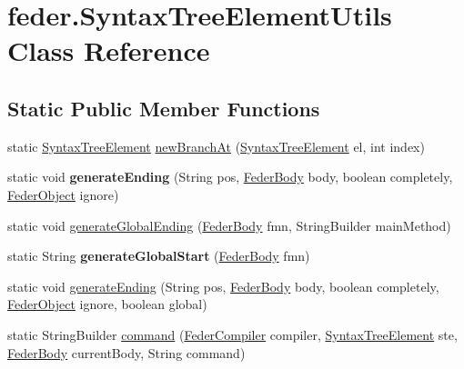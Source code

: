 \hypertarget{classfeder_1_1SyntaxTreeElementUtils}{}\section{feder.\+Syntax\+Tree\+Element\+Utils Class Reference}
\label{classfeder_1_1SyntaxTreeElementUtils}
\subsection*{Static Public Member Functions}
\begin{DoxyCompactItemize}
\item 
static \hyperlink{classfeder_1_1SyntaxTreeElement}{Syntax\+Tree\+Element} \hyperlink{classfeder_1_1SyntaxTreeElementUtils_afcde196c5acf46ac47215472b458a9db}{new\+Branch\+At} (\hyperlink{classfeder_1_1SyntaxTreeElement}{Syntax\+Tree\+Element} el, int index)
\item 
\mbox{\label{classfeder_1_1SyntaxTreeElementUtils_a7bdf9a560334fe2e7308d9605be30ada}} 
static void {\bfseries generate\+Ending} (String pos, \hyperlink{classfeder_1_1types_1_1FederBody}{Feder\+Body} body, boolean completely, \hyperlink{classfeder_1_1types_1_1FederObject}{Feder\+Object} ignore)
\item 
static void \hyperlink{classfeder_1_1SyntaxTreeElementUtils_a608f093f506ff9510122e9a1edb17a1f}{generate\+Global\+Ending} (\hyperlink{classfeder_1_1types_1_1FederBody}{Feder\+Body} fmn, String\+Builder main\+Method)
\item 
\mbox{\label{classfeder_1_1SyntaxTreeElementUtils_a01403205742701e146b72ef06497109f}} 
static String {\bfseries generate\+Global\+Start} (\hyperlink{classfeder_1_1types_1_1FederBody}{Feder\+Body} fmn)
\item 
static void \hyperlink{classfeder_1_1SyntaxTreeElementUtils_a40c8617b9b9836ebbe66dcdccdb52ffe}{generate\+Ending} (String pos, \hyperlink{classfeder_1_1types_1_1FederBody}{Feder\+Body} body, boolean completely, \hyperlink{classfeder_1_1types_1_1FederObject}{Feder\+Object} ignore, boolean global)
\item 
static String\+Builder \hyperlink{classfeder_1_1SyntaxTreeElementUtils_a7df6f6919bbef8d69def1af23b491fa3}{command} (\hyperlink{classfeder_1_1FederCompiler}{Feder\+Compiler} compiler, \hyperlink{classfeder_1_1SyntaxTreeElement}{Syntax\+Tree\+Element} ste, \hyperlink{classfeder_1_1types_1_1FederBody}{Feder\+Body} current\+Body, String command)

\end{DoxyCompactItemize}
